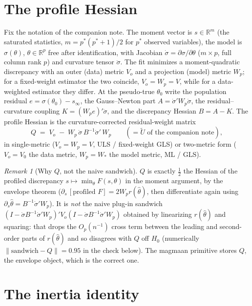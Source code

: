 \documentclass[11pt]{article}
\theoremstyle{plain}
\theoremstyle{remark}
\newtheorem*{remark}{Remark}
\begin{document}
\section{The profile Hessian}\label{sec:setup}

Fix the notation of the companion note. The moment vector is $s\in\mathbb R^m$
(the saturated statistics, $m=p^\ast(p^\ast+1)/2$ for $p^\ast$ observed
variables), the model is $\sigma(\theta)$, $\theta\in\mathbb R^p$ free after
identification, with Jacobian $\dot\sigma=\partial\sigma/\partial\theta$
($m\times p$, full column rank $p$) and curvature tensor $\ddot\sigma$. The fit
minimizes a moment-quadratic discrepancy with an outer (data) metric $V_{\!o}$
and a projection (model) metric $W_{\!p}$; for a fixed-weight estimator the two
coincide, $V_{\!o}=W_{\!p}=V$, while for a data-weighted estimator they differ.
At the pseudo-true $\theta_0$ write the population residual $e=\sigma(\theta_0)-s_\infty$,
the Gauss--Newton part $A=\dot\sigma'W_{\!p}\dot\sigma$, the
residual--curvature coupling $K=(W_{\!p}e)'\ddot\sigma$, and the discrepancy
Hessian $B=A-K$. The profile Hessian is the curvature-corrected residual-weight
matrix
\begin{equation}\label{eq:Q}
  Q \;=\; V_{\!o}\;-\;W_{\!p}\,\dot\sigma\,B^{-1}\dot\sigma'\,W_{\!p}
  \qquad(\text{$=\tilde U$ of the companion note}),
\end{equation}
in single-metric ($V_{\!o}=W_{\!p}=V$, ULS / fixed-weight GLS) or two-metric form
($V_{\!o}=V_0$ the data metric, $W_{\!p}=W_\ast$ the model metric, ML / GLS).

\begin{remark}[Why $Q$, not the naive sandwich]\label{rem:envelope}
$Q$ is exactly $\tfrac12$ the Hessian of the profiled discrepancy
$s\mapsto\min_\theta F(s,\theta)$ in the moment argument, by the envelope theorem
($\partial_s\,[\text{profiled }F]=2W_{\!p}r(\hat\theta)$, then differentiate again
using $\partial_s\hat\theta=B^{-1}\dot\sigma'W_{\!p}$). It is \emph{not} the naive
plug-in sandwich $(I-\dot\sigma B^{-1}\dot\sigma'W_{\!p})'V_{\!o}
(I-\dot\sigma B^{-1}\dot\sigma'W_{\!p})$ obtained by linearizing
$r(\hat\theta)$ and squaring: that drops the $O_p(n^{-1})$ cross term between the
leading and second-order parts of $r(\hat\theta)$ and so disagrees with $Q$ off
$H_0$ (numerically $\lVert\text{sandwich}-Q\rVert=0.95$ in the check below). The
magmaan primitive stores $Q$, the envelope object, which is the correct one.
\end{remark}

\section{The inertia identity}\label{sec:rank}
\end{document}
